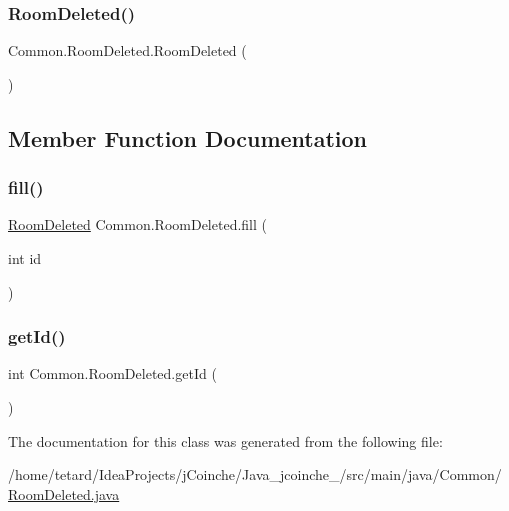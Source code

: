 \subsubsection{\texorpdfstring{Room\+Deleted()}{RoomDeleted()}}
{\footnotesize\ttfamily Common.\+Room\+Deleted.\+Room\+Deleted (\begin{DoxyParamCaption}{ }\end{DoxyParamCaption})\hspace{0.3cm}{\ttfamily [inline]}}



\subsection{Member Function Documentation}
\mbox{\label{classCommon_1_1RoomDeleted_ab5c2f4c0eb47d43c35bdd9a44a448c8c}} 
\subsubsection{\texorpdfstring{fill()}{fill()}}
{\footnotesize\ttfamily \mbox{\hyperlink{classCommon_1_1RoomDeleted}{Room\+Deleted}} Common.\+Room\+Deleted.\+fill (\begin{DoxyParamCaption}\item[{int}]{id }\end{DoxyParamCaption})\hspace{0.3cm}{\ttfamily [inline]}}

\mbox{\label{classCommon_1_1RoomDeleted_a1c44d88d0acfd24f2a37a01205b27d94}} 
\subsubsection{\texorpdfstring{get\+Id()}{getId()}}
{\footnotesize\ttfamily int Common.\+Room\+Deleted.\+get\+Id (\begin{DoxyParamCaption}{ }\end{DoxyParamCaption})\hspace{0.3cm}{\ttfamily [inline]}}



The documentation for this class was generated from the following file\+:\begin{DoxyCompactItemize}
\item 
/home/tetard/\+Idea\+Projects/j\+Coinche/\+Java\+\_\+jcoinche\+\_/src/main/java/\+Common/\mbox{\hyperlink{RoomDeleted_8java}{Room\+Deleted.\+java}}\end{DoxyCompactItemize}
